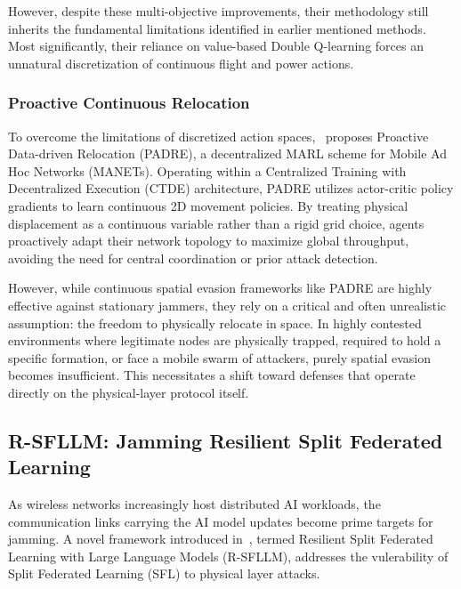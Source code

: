 \documentclass[conference]{IEEEtran}
\newcommand{\adm}[1]{{\color{orange}{[#1]}}}
\newcommand{\rar}[1]{{\color{blue}{[#1]}}}
\begin{document}
However, despite these multi-objective improvements, their methodology still inherits the fundamental limitations identified in earlier mentioned methods. 
Most significantly, their reliance on value-based Double Q-learning forces an unnatural discretization of continuous flight and power actions.

\subsubsection{Proactive Continuous Relocation}
To overcome the limitations of discretized action spaces,~ proposes Proactive Data-driven Relocation (PADRE), a decentralized MARL scheme for Mobile Ad Hoc Networks (MANETs).
Operating within a Centralized Training with Decentralized Execution (CTDE) architecture, PADRE utilizes actor-critic policy gradients to learn continuous 2D movement policies.
By treating physical displacement as a continuous variable rather than a rigid grid choice, agents proactively adapt their network topology to maximize global throughput, avoiding the need for central coordination or prior attack detection.

However, while continuous spatial evasion frameworks like PADRE are highly effective against stationary jammers, they rely on a critical and often unrealistic assumption: the freedom to physically relocate in space.
In highly contested environments where legitimate nodes are physically trapped, required to hold a specific formation, or face a mobile swarm of attackers, purely spatial evasion becomes insufficient.
This necessitates a shift toward defenses that operate directly on the physical-layer protocol itself.
\adm{yes, but we can also focus on phy-methods RW to keep it more relevant to your novel method's scope: it does not consider relocation but cooperative/synchronized PHY signal construction for max attack and max resiliency}
\rar{"it has strong assumptions than valianti (no phy tx power adaptation) but uses a more sophisticated rl model" -> maybe add this here somewhere}

\subsection{R-SFLLM: Jamming Resilient Split Federated Learning}
\rar{Before tackling these comments, decide whether its relevant for paper}
As wireless networks increasingly host distributed AI workloads, the communication links carrying the AI model updates become prime targets for jamming.
\adm{this is quite application-specific. we do not really mind what is carried by the application but rather focus on using AI-based methods to enhance system resiliency or attack impact}
A novel framework introduced in~, termed Resilient Split Federated Learning with Large Language Models (R-SFLLM), addresses the vulerability of Split Federated Learning (SFL) to physical layer attacks. 
\end{document}
